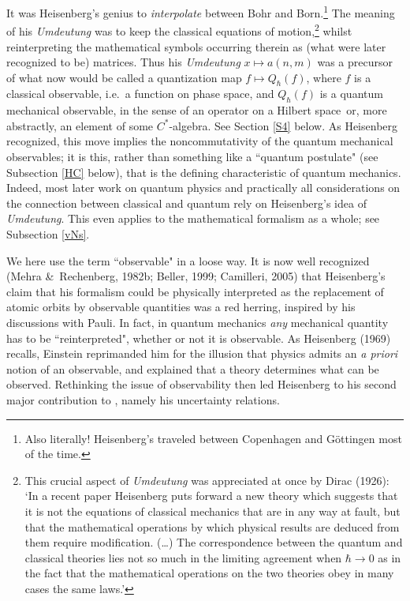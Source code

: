 \documentclass[12pt,titlepage]{article}
\newcommand{\ca}{$C^*$-algebra} \newcommand{\jba}{JB-algebra}
\newcommand{\Hs}{Hilbert space} \newcommand{\Bs}{Banach space}
\newcommand{\raw}{\rightarrow} \newcommand{\rat}{\mapsto}
\begin{document}
It was Heisenberg's genius to {\it interpolate} between Bohr and Born.\footnote{Also literally!  Heisenberg's traveled between Copenhagen and G\"{o}ttingen most of the time.} The meaning of his \textit{Umdeutung}  was to keep the classical equations of motion,\footnote{This crucial aspect of  \textit{Umdeutung} was appreciated at once by Dirac (1926): `In a recent paper Heisenberg puts forward a new theory which suggests that  it is not the equations of classical mechanics that are in any way at fault, but that the mathematical operations by which physical results are deduced from them require modification. (\ldots)  The correspondence between the quantum and classical theories lies not so much in the limiting agreement when $\hbar\raw 0$ as in the fact that the mathematical operations on the two theories obey in many cases the same laws.'}  whilst reinterpreting the mathematical symbols occurring therein as (what were later recognized to be) matrices. Thus his \textit{Umdeutung} $x\mapsto a(n,m)$ was a precursor of what now would be called a quantization map $f\mapsto Q_{\hbar}(f)$, where $f$ is a classical observable, i.e.\ a function on phase space, and $Q_{\hbar}(f)$ is a quantum mechanical observable, in the sense of an operator on a \Hs\ or, more abstractly, an element of some \ca. See Section \ref{S4} below. 
As Heisenberg recognized, this move implies the noncommutativity of the quantum mechanical observables; it is this, rather than something like a ``quantum postulate" (see Subsection \ref{HC} below), that is the defining characteristic of quantum mechanics. Indeed, most later work on quantum physics and practically all considerations on the connection between classical and quantum rely on Heisenberg's idea of \textit{Umdeutung}. This even applies to the mathematical formalism as a whole; see Subsection \ref{vNs}. 

We here use the term ``observable" in a loose way. It is now well recognized (Mehra \&\ Rechenberg, 1982b; Beller, 1999; Camilleri, 2005) that Heisenberg's claim that his formalism could be physically interpreted as the replacement of atomic orbits by observable quantities was a red herring, inspired by his discussions with Pauli.
 In fact, in quantum mechanics \textit{any} mechanical quantity has to be ``reinterpreted", whether or not it is observable. As Heisenberg (1969) recalls, Einstein reprimanded him for the illusion that physics admits an \textit{a priori} notion of an observable, and explained that a theory determines what can be observed. Rethinking the issue of observability then led Heisenberg to his second major contribution to \qm, namely his uncertainty relations. 
\end{document}
